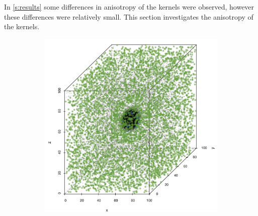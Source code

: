 
In \cref{s:results} some differences in anisotropy of the kernels were observed, however these differences were relatively small. This section investigates the anisotropy of the kernels. 
	
		\begin{figure}
			\centering
			\begin{subfigure}{0.23\textwidth}
				\centering
				\includegraphics[keepaspectratio=true, width=\textwidth, height=0.23\textheight]{discussion/img/ferdosi_1_60000_anisotropy.png}
				\caption{}
				\label{fig:discussion:anisotropy:ferdosi1}
			\end{subfigure}
			\begin{subfigure}{0.23\textwidth}
				\centering

\end{subfigure}
\end{figure}
